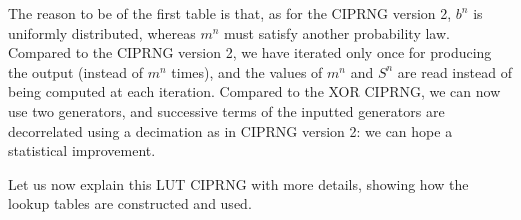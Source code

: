 The reason to be of the first table is that, as for the CIPRNG version 2, $b^n$
is uniformly distributed, whereas $m^n$ must satisfy another probability law. Compared to the 
CIPRNG version 2, we have iterated only once for producing the output (instead
of $m^n$ times), and the values of $m^n$ and $S^n$ are read instead of being
computed at each iteration. Compared to the XOR CIPRNG, we can now use two 
generators, and successive terms of the inputted generators are decorrelated 
using a decimation as in CIPRNG version 2: we can hope a statistical improvement.


Let us now explain this LUT CIPRNG with more details, showing how the lookup
tables are constructed and used.






